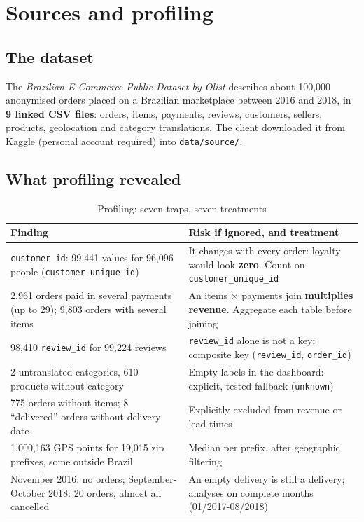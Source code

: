\documentclass[11pt, a4paper, oneside, headings=normal, numbers=noenddot, DIV=12]{scrartcl}
\begin{document}
\section{Sources and profiling}

\subsection{The dataset}
The \emph{Brazilian E-Commerce Public Dataset by Olist} describes about 100,000 anonymised orders placed on a Brazilian marketplace
between 2016 and 2018, in \textbf{9 linked CSV files}: orders, items, payments, reviews, customers, sellers, products, geolocation and
category translations. The client downloaded it from Kaggle (personal account required) into \texttt{data/source/}.

\subsection{What profiling revealed}
\begin{table}[H]
\centering\small
\begin{tabularx}{\linewidth}{@{}L{5.6cm} Y@{}}
\toprule
\textbf{Finding} & \textbf{Risk if ignored, and treatment} \\
\midrule
\texttt{customer\_id}: 99,441 values for 96,096 people (\texttt{customer\_unique\_id}) & It changes with every order: loyalty would look \textbf{zero}. Count on \texttt{customer\_unique\_id} \\
2,961 orders paid in several payments (up to 29); 9,803 orders with several items & An items × payments join \textbf{multiplies revenue}. Aggregate each table before joining \\
98,410 \texttt{review\_id} for 99,224 reviews & \texttt{review\_id} alone is not a key: composite key (\texttt{review\_id}, \texttt{order\_id}) \\
2 untranslated categories, 610 products without category & Empty labels in the dashboard: explicit, tested fallback (\texttt{unknown}) \\
775 orders without items; 8 ``delivered'' orders without delivery date & Explicitly excluded from revenue or lead times \\
1,000,163 GPS points for 19,015 zip prefixes, some outside Brazil & Median per prefix, after geographic filtering \\
November 2016: no orders; September-October 2018: 20 orders, almost all cancelled & An empty delivery is still a delivery; analyses on complete months (01/2017-08/2018) \\
\bottomrule
\end{tabularx}
\caption{Profiling: seven traps, seven treatments}
\end{table}
\end{document}
